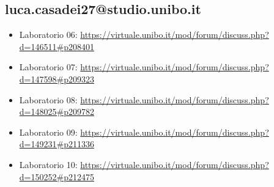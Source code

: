 \documentclass[a4paper,12pt]{report}
\begin{document}
\subsection{luca.casadei27@studio.unibo.it}
\begin{itemize}
	\item Laboratorio 06: \url{https://virtuale.unibo.it/mod/forum/discuss.php?d=146511#p208401}
	\item Laboratorio 07: \url{https://virtuale.unibo.it/mod/forum/discuss.php?d=147598#p209323}
	\item Laboratorio 08: \url{https://virtuale.unibo.it/mod/forum/discuss.php?d=148025#p209782}
	\item Laboratorio 09: \url{https://virtuale.unibo.it/mod/forum/discuss.php?d=149231#p211336}
	\item Laboratorio 10: \url{https://virtuale.unibo.it/mod/forum/discuss.php?d=150252#p212475}
\end{itemize}
\end{document}

